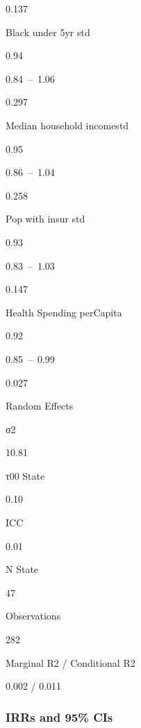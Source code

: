 \documentclass[
]{article}
\newenvironment{Shaded}{\begin{snugshade}}{\end{snugshade}}
\newcommand{\AttributeTok}[1]{\textcolor[rgb]{0.13,0.29,0.53}{#1}}
\newcommand{\FloatTok}[1]{\textcolor[rgb]{0.00,0.00,0.81}{#1}}
\newcommand{\FunctionTok}[1]{\textcolor[rgb]{0.13,0.29,0.53}{\textbf{#1}}}
\newcommand{\NormalTok}[1]{#1}
\newcommand{\OtherTok}[1]{\textcolor[rgb]{0.56,0.35,0.01}{#1}}
\newcommand{\SpecialCharTok}[1]{\textcolor[rgb]{0.81,0.36,0.00}{\textbf{#1}}}
\newcommand{\StringTok}[1]{\textcolor[rgb]{0.31,0.60,0.02}{#1}}
\begin{document}
0.137

Black under 5yr std

0.94

0.84~--~1.06

0.297

Median household incomestd

0.95

0.86~--~1.04

0.258

Pop with insur std

0.93

0.83~--~1.03

0.147

Health Spending perCapita

0.92

0.85~--~0.99

0.027

Random Effects

σ2

10.81

τ00 State

0.10

ICC

0.01

N State

47

Observations

282

Marginal R2 / Conditional R2

0.002 / 0.011

\hypertarget{irrs-and-95-cis}{%
\subsubsection{IRRs and 95\% CIs}\label{irrs-and-95-cis}}

\begin{Shaded}
\end{Shaded}
\end{document}
